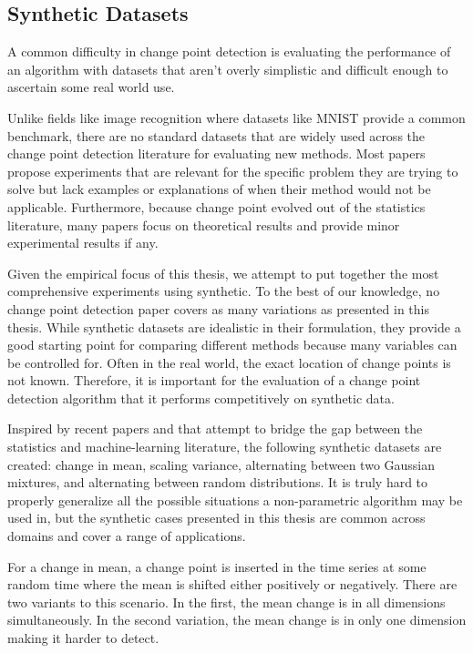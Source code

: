 \subsection{Synthetic Datasets}
A common difficulty in change point detection is evaluating the performance of an algorithm with datasets that aren't overly simplistic and difficult enough to ascertain some real world use.

Unlike fields like image recognition where datasets like MNIST provide a common benchmark, there are no standard datasets that are widely used across the change point detection literature for evaluating new methods. Most papers propose experiments that are relevant for the specific problem they are trying to solve  but lack examples or explanations of when their method would not be applicable.  Furthermore, because change point evolved out of the statistics literature, many papers focus on theoretical results and provide minor experimental results if any.

Given the empirical focus of this thesis, we attempt to put together the most comprehensive experiments using synthetic. To the best of our knowledge, no change point detection paper covers as many variations as presented in this thesis. While synthetic datasets are idealistic in their formulation, they provide a good starting point for comparing different methods because many variables can be controlled for. Often in the real world, the exact location of change points is not known. Therefore, it is important for the evaluation of a change point detection algorithm that it performs competitively on synthetic data.

Inspired by recent papers \cite{chang2019kernel} and \cite{flynn2019change} that attempt to bridge the gap between the statistics and machine-learning literature, the following synthetic datasets are created: change in mean, scaling variance, alternating between two Gaussian mixtures, and alternating between random distributions. It is truly hard to properly generalize all the possible situations a non-parametric algorithm may be used in, but the synthetic cases presented in this thesis are common across domains and cover a range of applications.

For a change in mean, a change point is inserted in the time series at some random time where the mean is shifted either positively or negatively. There are two variants to this scenario. In the first, the mean change is in all dimensions simultaneously. In the second variation, the mean change is in only one dimension making it harder to detect. 

